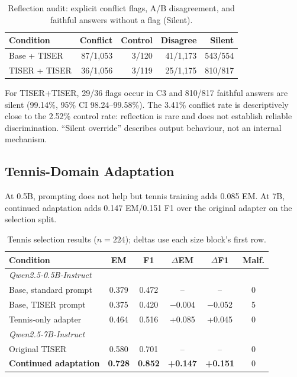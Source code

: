 \documentclass[conference]{IEEEtran}
\begin{document}
\begin{table}[t]
\centering
\caption{Reflection audit: explicit conflict flags, A/B disagreement, and faithful answers without a flag (Silent).}
\label{tab:reflection-audit}
\setlength{\tabcolsep}{2.4pt}
{\footnotesize
\begin{tabular}{lrrrr}
\toprule
\textbf{Condition} & \textbf{Conflict} & \textbf{Control} & \textbf{Disagree} & \textbf{Silent} \\
\midrule
Base + TISER & 87/1{,}053 & 3/120 & 41/1{,}173 & 543/554 \\
\rowcolor{gray!18}
TISER + TISER & 36/1{,}056 & 3/119 & 25/1{,}175 & 810/817 \\
\bottomrule
\end{tabular}
}
\end{table}

For TISER+TISER, 29/36 flags occur in C3 and 810/817 faithful answers are silent (99.14\%, 95\% CI 98.24--99.58\%). The 3.41\% conflict rate is descriptively close to the 2.52\% control rate: reflection is rare and does not establish reliable discrimination. ``Silent override'' describes output behaviour, not an internal mechanism.

\subsection{Tennis-Domain Adaptation}

At 0.5B, prompting does not help but tennis training adds 0.085 EM. At 7B, continued adaptation adds 0.147 EM/0.151 F1 over the original adapter on the selection split.

\begin{table}[t]
\centering
\caption{Tennis selection results ($n=224$); deltas use each size block's first row.}
\label{tab:tennis}
\setlength{\tabcolsep}{3.4pt}
{\footnotesize
\begin{tabular}{lccccc}
\toprule
\textbf{Condition} & \textbf{EM} & \textbf{F1} & \textbf{$\Delta$EM} & \textbf{$\Delta$F1} & \textbf{Malf.} \\
\midrule
\multicolumn{6}{l}{\emph{Qwen2.5-0.5B-Instruct}} \\
Base, standard prompt   & 0.379 & 0.472 & -- & -- & 0 \\
Base, TISER prompt      & 0.375 & 0.420 & $-$0.004 & $-$0.052 & 5 \\
\rowcolor{gray!10}
Tennis-only adapter     & 0.464 & 0.516 & +0.085 & +0.045 & 0 \\
\midrule
\multicolumn{6}{l}{\emph{Qwen2.5-7B-Instruct}} \\
Original TISER & 0.580 & 0.701 & -- & -- & 0 \\
\rowcolor{gray!18}
\textbf{Continued adaptation} & \textbf{0.728} & \textbf{0.852} & \textbf{+0.147} & \textbf{+0.151} & 0 \\
\bottomrule
\end{tabular}
}
\end{table}
\end{document}
